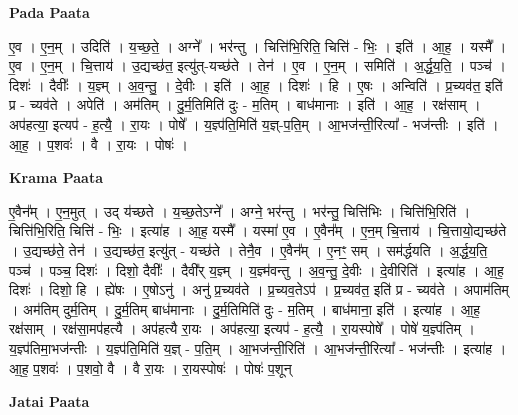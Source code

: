 \documentclass[17pt]{extarticle}
\begin{document}
\textbf{Pada Paata} \newline

ए॒व । ए॒न॒म् । उदिति॑ । य॒च्छ॒ते॒ । अग्ने᳚ । भर॑न्तु । चित्ति॑भि॒रिति॒ चित्ति॑ - भिः॒ । इति॑ । आ॒ह॒ । यस्मै᳚ । ए॒व । ए॒न॒म् । चि॒त्ताय॑ । उ॒द्यच्छ॑त॒ इत्यु॑त्-यच्छ॑ते । तेन॑ । ए॒व । ए॒न॒म् । समिति॑ । अ॒र्द्ध॒य॒ति॒ । पञ्च॑ । दिशः॑ । दैवीः᳚ । य॒ज्ञ्म् । अ॒व॒न्तु॒ । दे॒वीः । इति॑ । आ॒ह॒ । दिशः॑ । हि । ए॒षः । अन्विति॑ । प्र॒च्यव॑त॒ इति॑ प्र - च्यव॑ते । अपेति॑ । अम॑तिम् । दु॒र्म॒तिमिति॑ दुः - म॒तिम् । बाध॑मानाः । इति॑ । आ॒ह॒ । रक्ष॑साम् । अप॑हत्या॒ इत्यप॑ - ह॒त्यै॒ । रा॒यः । पोषे᳚ । य॒ज्ञ्प॑ति॒मिति॑ य॒ज्ञ्-प॒ति॒म् । आ॒भज॑न्ती॒रित्या᳚ - भज॑न्तीः । इति॑ । आ॒ह॒ । प॒शवः॑ । वै । रा॒यः । पोषः॑ ।  \newline


\textbf{Krama Paata} \newline

ए॒वैन᳚म् । ए॒न॒मुत् । उद् य॑च्छते । य॒च्छ॒तेऽग्ने᳚ । अग्ने॒ भर॑न्तु । भर॑न्तु॒ चित्ति॑भिः । चित्ति॑भि॒रिति॑ । चित्ति॑भि॒रिति॒ चित्ति॑ - भिः॒ । इत्या॑ह । आ॒ह॒ यस्मै᳚ । यस्मा॑ ए॒व । ए॒वैन᳚म् । ए॒न॒म् चि॒त्ताय॑ । चि॒त्तायो॒द्यच्छ॑ते । उ॒द्यच्छ॑ते॒ तेन॑ । उ॒द्यच्छ॑त॒ इत्यु॑त् - यच्छ॑ते । तेनै॒व । 
ए॒वैन᳚म् । ए॒नꣳ॒॒ सम् । सम॑र्द्धयति । अ॒र्द्ध॒य॒ति॒ पञ्च॑ । पञ्च॒ दिशः॑ । दिशो॒ दैवीः᳚ । दैवी᳚र् य॒ज्ञ्म् । य॒ज्ञ्म॑वन्तु । अ॒व॒न्तु॒ दे॒वीः । दे॒वीरिति॑ । इत्या॑ह । आ॒ह॒ दिशः॑ । दिशो॒ हि । ह्ये॑षः । ए॒षोऽनु॑ । अनु॑ प्र॒च्यव॑ते । प्र॒च्यव॒तेऽप॑ । प्र॒च्यव॑त॒ इति॑ प्र - च्यव॑ते । अपाम॑तिम् । अम॑तिम् दुर्म॒तिम् । दु॒र्म॒तिम् बाध॑मानाः । दु॒र्म॒तिमिति॑ दुः - म॒तिम् । बाध॑माना॒ इति॑ । इत्या॑ह । आ॒ह॒ रक्ष॑साम् । रक्ष॑सा॒मप॑हत्यै । अप॑हत्यै रा॒यः । अप॑हत्या॒ इत्यप॑ - ह॒त्यै॒ । रा॒यस्पोषे᳚ । पोषे॑ य॒ज्ञ्प॑तिम् । य॒ज्ञ्प॑तिमा॒भज॑न्तीः । य॒ज्ञ्प॑ति॒मिति॑ य॒ज्ञ् - प॒ति॒म् । आ॒भज॑न्ती॒रिति॑ । आ॒भज॑न्ती॒रित्या᳚ - भज॑न्तीः । इत्या॑ह । आ॒ह॒ प॒शवः॑ । प॒शवो॒ वै । वै रा॒यः । रा॒यस्पोषः॑ । पोषः॑ प॒शून् \newline

\textbf{Jatai Paata} \newline
\end{document}
